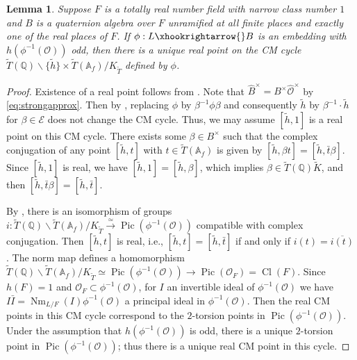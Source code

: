 \documentclass{amsart}
\numberwithin{equation}{subsection}
\numberwithin{theorem}{section}
\newtheorem{lemma}[theorem]{Lemma}
\theoremstyle{definition}
\theoremstyle{remark}
\newcommand{\bA}{\mathbb{A}}
\newcommand{\bQ}{\mathbb{Q}}
\newcommand{\cE}{\mathcal{E}}
\newcommand{\cO}{\mathcal{O}}
\DeclareMathOperator{\Nm}{Nm}
\DeclareMathOperator{\Cl}{Cl}
\DeclareMathOperator{\Pic}{Pic}
\begin{document}
\begin{lemma} \label{lem:uniquereal}
    Suppose $F$ is a totally real number field with narrow class number $1$ and $B$ is a quaternion algebra over $F$ unramified at all finite places and exactly one of the real places of $F$. If $\phi: L\xhookrightarrow{}B$ is an embedding with $h(\phi^{-1}(\cO))$ odd, then there is a unique real point on the CM cycle  $\widetilde{T}(\bQ) \backslash \{\tilde{h}\} \times\widetilde{T}(\bA_f) / K_{\widetilde{T}}$ defined by $\phi$.   
\end{lemma}
\begin{proof}
    Existence of a real point follows from . Note that $\widehat{B}^\times = B^\times \widehat{\cO}^\times$ by \eqref{eq:strongapprox}. 
    Then by , replacing $\phi$ by $\beta^{-1}\phi\beta$ and consequently $\tilde{h}$ by $\beta^{-1}\cdot \tilde{h}$ for $\beta\in\cE$ does not change the CM cycle. Thus, we may assume $[\tilde{h},1]$ is a real point on this CM cycle. There exists some $\beta\in B^\times$ such that the complex conjugation of any point $[\tilde{h},t]$ with $ t\in \widetilde{T}(\bA_f)$ is given by $[\tilde{h}, \beta t] = [\tilde{h}, \bar{t}\beta]$. Since $[\tilde{h}, 1]$ is real, we have $[\tilde{h}, 1] = [\tilde{h}, \beta]$, which implies $\beta \in \widetilde{T}(\bQ) \widetilde{K}$, and then $[\tilde{h}, \bar{t}\beta] = [\tilde{h}, \bar{t}]$.

    By , there is an isomorphism of groups $i:\widetilde{T}(\bQ)\backslash \widetilde{T}(\bA_f)/ K_{\widetilde{T}} \xrightarrow{\simeq} \Pic(\phi^{-1}(\cO))$ compatible with complex conjugation. Then $[\tilde{h}, t]$ is real, i.e.,  $[\tilde{h}, t] = [\tilde{h}, \bar{t}]$ if and only if $i(t) = \overline{i(t)}$.
    The norm map defines a homomorphism $\widetilde{T}(\bQ)\backslash \widetilde{T}(\bA_f)/ K_{\widetilde{T}} \simeq \Pic(\phi^{-1}(\cO))\to \Pic(\cO_F) = \Cl(F)$. Since $h(F) = 1$ and $\mathcal{O}_F\subset \phi^{-1}(\mathcal{O})$, for $I$ an invertible ideal of $\phi^{-1}(\cO)$ we have $I\bar{I} = \Nm_{L/F}(I) \phi^{-1}(\cO)$ a principal ideal in $\phi^{-1}(\cO)$. Then the real CM points in this CM cycle correspond to the $2$-torsion points in $\Pic(\phi^{-1}(\cO))$. Under the assumption that $h(\phi^{-1}(\cO))$ is odd, there is a unique $2$-torsion point in $\Pic(\phi^{-1}(\cO))$; thus there is a unique real CM point in this cycle. 
\end{proof}
\end{document}

